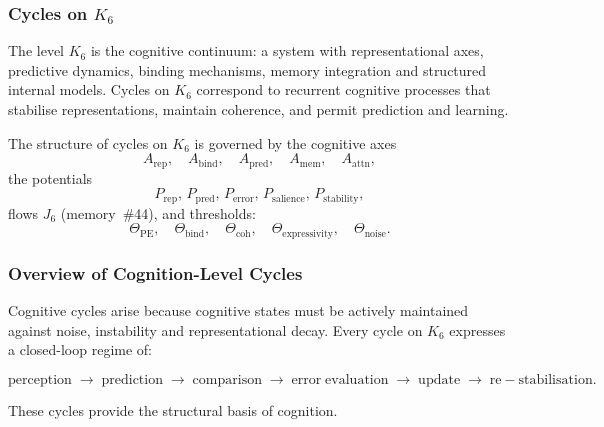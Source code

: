 
\subsubsection{Cycles on \texorpdfstring{$K_6$}{K_6}}
\label{sec:cycles-k6}

The level $K_6$ is the cognitive continuum: a system with representational
axes, predictive dynamics, binding mechanisms, memory integration and
structured internal models.  
Cycles on $K_6$ correspond to recurrent cognitive processes that stabilise
representations, maintain coherence, and permit prediction and learning.

The structure of cycles on $K_6$ is governed by the cognitive axes
\[
 A_{\mathrm{rep}},\quad
 A_{\mathrm{bind}},\quad
 A_{\mathrm{pred}},\quad
 A_{\mathrm{mem}},\quad
 A_{\mathrm{attn}},
\]
the potentials
\[
 P_{\mathrm{rep}},\, P_{\mathrm{pred}},\, P_{\mathrm{error}},\, 
 P_{\mathrm{salience}},\, P_{\mathrm{stability}},
\]
flows $J_6$ (memory~\#44), and thresholds:
\[
 \Theta_{\mathrm{PE}},\quad
 \Theta_{\mathrm{bind}},\quad
 \Theta_{\mathrm{coh}},\quad
 \Theta_{\mathrm{expressivity}},\quad
 \Theta_{\mathrm{noise}}.
\]

\subsubsection{Overview of Cognition-Level Cycles}

Cognitive cycles arise because cognitive states must be actively maintained
against noise, instability and representational decay.  
Every cycle on $K_6$ expresses a closed-loop regime of:

\[
  \mathrm{perception}
  \;\to\;
  \mathrm{prediction}
  \;\to\;
  \mathrm{comparison}
  \;\to\;
  \mathrm{error\;evaluation}
  \;\to\;
  \mathrm{update}
  \;\to\;
  \mathrm{re-stabilisation}.
\]

These cycles provide the structural basis of cognition.

